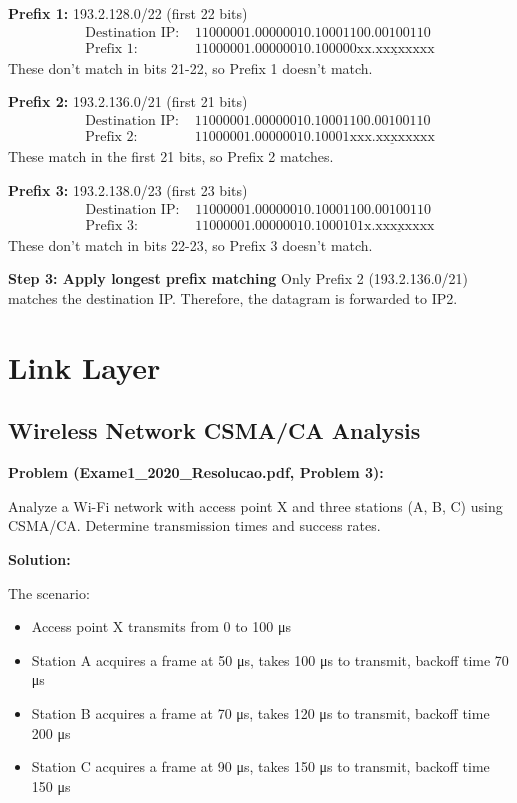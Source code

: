 \documentclass[11pt,a4paper]{article}
\begin{document}
\textbf{Prefix 1:} 193.2.128.0/22 (first 22 bits)
\begin{align}
\text{Destination IP: } &11000001.00000010.10001100.00100110\\
\text{Prefix 1: } &11000001.00000010.100000\underline{\text{xx.xxxxxxxx}}
\end{align}
These don't match in bits 21-22, so Prefix 1 doesn't match.

\textbf{Prefix 2:} 193.2.136.0/21 (first 21 bits)
\begin{align}
\text{Destination IP: } &11000001.00000010.10001100.00100110\\
\text{Prefix 2: } &11000001.00000010.10001\underline{\text{xxx.xxxxxxxx}}
\end{align}
These match in the first 21 bits, so Prefix 2 matches.

\textbf{Prefix 3:} 193.2.138.0/23 (first 23 bits)
\begin{align}
\text{Destination IP: } &11000001.00000010.10001100.00100110\\
\text{Prefix 3: } &11000001.00000010.1000101\underline{\text{x.xxxxxxxx}}
\end{align}
These don't match in bits 22-23, so Prefix 3 doesn't match.

\textbf{Step 3: Apply longest prefix matching}
Only Prefix 2 (193.2.136.0/21) matches the destination IP. Therefore, the datagram is forwarded to IP2.

\section{Link Layer}

\subsection{Wireless Network CSMA/CA Analysis}
\textbf{Problem (Exame1\_2020\_Resolucao.pdf, Problem 3):}

Analyze a Wi-Fi network with access point X and three stations (A, B, C) using CSMA/CA. Determine transmission times and success rates.

\textbf{Solution:}

The scenario:
\begin{itemize}
    \item Access point X transmits from 0 to 100 μs
    \item Station A acquires a frame at 50 μs, takes 100 μs to transmit, backoff time 70 μs
    \item Station B acquires a frame at 70 μs, takes 120 μs to transmit, backoff time 200 μs
    \item Station C acquires a frame at 90 μs, takes 150 μs to transmit, backoff time 150 μs
\end{itemize}
\end{document}
